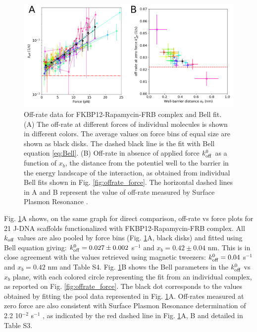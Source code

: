 \documentclass{biophys-new}
\begin{document}
\begin{figure}[hbt!]
	\centering
	\includegraphics[width=0.75\linewidth]{Figures/fig3.png}
	\caption{Off-rate data for FKBP12-Rapamycin-FRB complex and Bell fit. (A) The off-rate at different forces of individual molecules is shown in different colors. The average values on force bins of equal size are shown as black disks. The dashed black line is the fit with Bell equation \ref{eq:Bell}. (B) Off-rate in absence of applied force $k^0_{\rm off}$ as a function of $x_b$, the distance from the potentiel well to the barrier in the energy landscape of the interaction, as obtained from individual Bell fits shown in Fig. \ref{fig:offrate_force}. The horizontal dashed lines in A and B represent the value of off-rate measured by Surface Plasmon Resonance \cite{banaszynski2005}.}
	\label{fig:bell_parameters}	
\end{figure}

Fig. \ref{fig:bell_parameters}A shows, on the same graph for direct comparison, off-rate vs force plots for 21 J-DNA scaffolds functionalized with FKBP12-Rapamycin-FRB complex. All $ k_{\rm off}$ values are also pooled by force bins (Fig. \ref{fig:bell_parameters}A, black disks) and fitted using Bell equation giving: $k^0_{\rm off}=0.027 \pm 0.002$  s$^{-1}$ and $x_b = 0.42 \pm 0.04$ nm. This is in close agreement with the values retrieved using magnetic tweezers: $k^0_{\rm off}=0.04$ s$^{-1}$ and $x_b=0.42$ nm \cite{kostrz2019} and Table S4. Fig. \ref{fig:bell_parameters}B shows the Bell parameters in the $k^0_{\rm off}$ vs $x_b$ plane, with each colored circle representing the fit from an individual complex, as reported on Fig. \ref{fig:offrate_force}. The black dot corresponds to the values obtained by fitting the pool data represented in Fig. \ref{fig:bell_parameters}A. Off-rates measured at zero force are also consistent with Surface Plasmon Resonance determination of 2.2 10$^{-2}$ s$^{-1}$ \cite{banaszynski2005}, as indicated by the red dashed line in Fig. \ref{fig:bell_parameters}A, B and detailed in Table S3.
\end{document}
